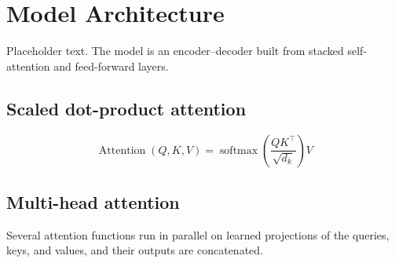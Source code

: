 \section{Model Architecture}

Placeholder text. The model is an encoder--decoder built from stacked self-attention and feed-forward layers.

\subsection{Scaled dot-product attention}

\begin{equation}
  \operatorname{Attention}(Q, K, V) = \operatorname{softmax}\left( \frac{Q K^\top}{\sqrt{d_k}} \right) V
\end{equation}

\subsection{Multi-head attention}

Several attention functions run in parallel on learned projections of the queries, keys, and values, and their outputs are concatenated.
